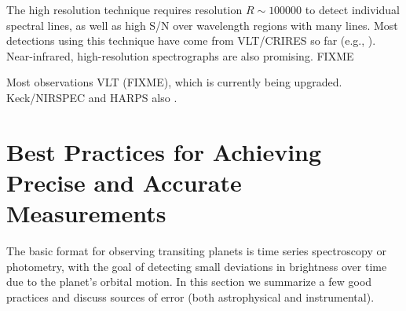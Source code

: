 \documentclass[graybox,natbib,nosecnum]{svmult}
\begin{document}
The high resolution technique requires resolution $R\sim100000$ to detect individual spectral lines, as well as high S/N over wavelength regions with many lines. Most detections using this technique have come from VLT/CRIRES so far (e.g., ). Near-infrared, high-resolution spectrographs are also promising. FIXME

Most observations VLT (FIXME), which is currently being upgraded.  Keck/NIRSPEC and HARPS also \citep{lockwood14, martins15}.

\section{Best Practices for Achieving Precise and Accurate Measurements}
The basic format for observing transiting planets is time series spectroscopy or photometry, with the goal of detecting small deviations in brightness over time due to the planet's orbital motion.  In this section we summarize a few good practices and discuss sources of error (both astrophysical and instrumental).


\end{document}
